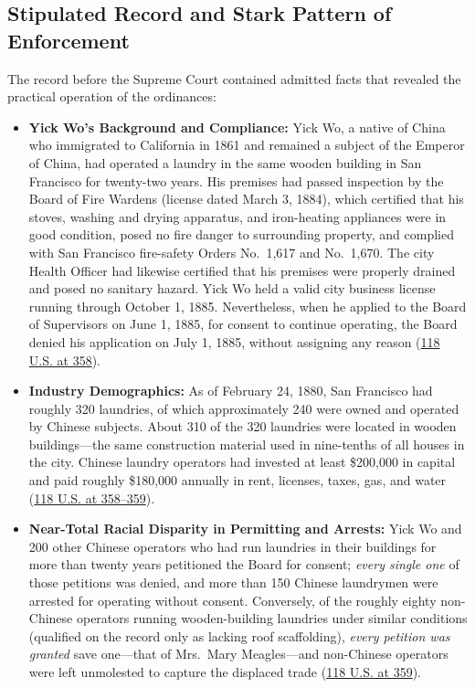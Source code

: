 \documentclass[12pt]{article}
\begin{document}
\subsection{Stipulated Record and Stark Pattern of Enforcement}
The record before the Supreme Court contained admitted facts that revealed the practical operation of the ordinances:
\begin{itemize}
    \item \textbf{Yick Wo's Background and Compliance:} Yick Wo, a native of China who immigrated to California in 1861 and remained a subject of the Emperor of China, had operated a laundry in the same wooden building in San Francisco for twenty-two years. His premises had passed inspection by the Board of Fire Wardens (license dated March 3, 1884), which certified that his stoves, washing and drying apparatus, and iron-heating appliances were in good condition, posed no fire danger to surrounding property, and complied with San Francisco fire-safety Orders No.~1,617 and No.~1,670. The city Health Officer had likewise certified that his premises were properly drained and posed no sanitary hazard. Yick Wo held a valid city business license running through October 1, 1885. Nevertheless, when he applied to the Board of Supervisors on June 1, 1885, for consent to continue operating, the Board denied his application on July 1, 1885, without assigning any reason (\href{https://supreme.justia.com/cases/federal/us/118/356/}{118 U.S. at 358}).
    \item \textbf{Industry Demographics:} As of February 24, 1880, San Francisco had roughly 320 laundries, of which approximately 240 were owned and operated by Chinese subjects. About 310 of the 320 laundries were located in wooden buildings---the same construction material used in nine-tenths of all houses in the city. Chinese laundry operators had invested at least \$200,000 in capital and paid roughly \$180,000 annually in rent, licenses, taxes, gas, and water (\href{https://supreme.justia.com/cases/federal/us/118/356/}{118 U.S. at 358--359}).
    \item \textbf{Near-Total Racial Disparity in Permitting and Arrests:} Yick Wo and 200 other Chinese operators who had run laundries in their buildings for more than twenty years petitioned the Board for consent; \emph{every single one} of those petitions was denied, and more than 150 Chinese laundrymen were arrested for operating without consent. Conversely, of the roughly eighty non-Chinese operators running wooden-building laundries under similar conditions (qualified on the record only as lacking roof scaffolding), \emph{every petition was granted} save one---that of Mrs.~Mary Meagles---and non-Chinese operators were left unmolested to capture the displaced trade (\href{https://supreme.justia.com/cases/federal/us/118/356/}{118 U.S. at 359}).
\end{itemize}
\end{document}
